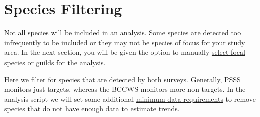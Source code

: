 \documentclass[
  letterpaper,
  DIV=11,
  numbers=noendperiod]{scrreprt}
\newenvironment{Shaded}{\begin{snugshade}}{\end{snugshade}}
\newcommand{\AttributeTok}[1]{\textcolor[rgb]{0.40,0.45,0.13}{#1}}
\newcommand{\CommentTok}[1]{\textcolor[rgb]{0.37,0.37,0.37}{#1}}
\newcommand{\ConstantTok}[1]{\textcolor[rgb]{0.56,0.35,0.01}{#1}}
\newcommand{\FunctionTok}[1]{\textcolor[rgb]{0.28,0.35,0.67}{#1}}
\newcommand{\NormalTok}[1]{\textcolor[rgb]{0.00,0.23,0.31}{#1}}
\newcommand{\OtherTok}[1]{\textcolor[rgb]{0.00,0.23,0.31}{#1}}
\newcommand{\SpecialCharTok}[1]{\textcolor[rgb]{0.37,0.37,0.37}{#1}}
\newcommand{\StringTok}[1]{\textcolor[rgb]{0.13,0.47,0.30}{#1}}
\begin{document}
\begin{Shaded}
\end{Shaded}

\section{Species Filtering}\label{2.4Data}

Not all species will be included in an analysis. Some species are
detected too infrequently to be included or they may not be species of
focus for your study area. In the next section, you will be given the
option to manually \hyperref[3.1.2Analysis]{select focal species or
guilds} for the analysis.

Here we filter for species that are detected by both surveys. Generally,
PSSS monitors just targets, whereas the BCCWS monitors more non-targets.
In the analysis script we will set some additional
\hyperref[3.1.3Analysis]{minimum data requirements} to remove species
that do not have enough data to estimate trends.
\end{document}
